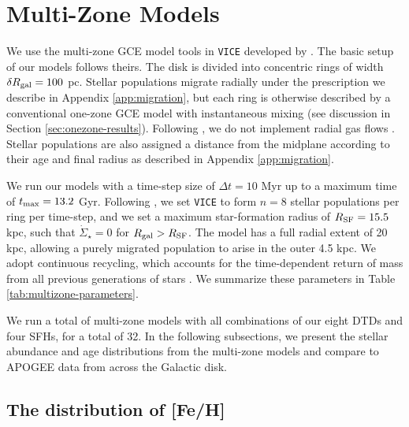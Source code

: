 \documentclass[twocolumn,twocolappendix,linenumbers]{aastex631}
\newcommand{\vice}{{\tt VICE}\xspace}
\begin{document}
\section{Multi-Zone Models}
\label{sec:multizone-results}

We use the multi-zone GCE model tools in \vice developed by . The basic setup of our models follows theirs. The disk is divided into concentric rings of width $\delta R_{\rm gal}=100$ pc. Stellar populations migrate radially under the prescription we describe in Appendix \ref{app:migration}, but each ring is otherwise described by a conventional one-zone GCE model with instantaneous mixing (see discussion in Section \ref{sec:onezone-results}). Following , we do not implement radial gas flows \citep[e.g.,][]{LaceyFall1985-RadialGasFlows,BilitewskiSchonrich2012-RadialFlows}. Stellar populations are also assigned a distance from the midplane according to their age and final radius as described in Appendix \ref{app:migration}.

We run our models with a time-step size of $\Delta t=10$ Myr up to a maximum time of $t_{\rm max}=13.2$ Gyr. Following , we set \vice to form $n=8$ stellar populations per ring per time-step, and we set a maximum star-formation radius of $R_{\rm SF} = 15.5$ kpc, such that $\dot\Sigma_\star=0$ for $R_{\rm gal}>R_{\rm SF}$. The model has a full radial extent of 20 kpc, allowing a purely migrated population to arise in the outer 4.5 kpc. We adopt continuous recycling, which accounts for the time-dependent return of mass from all previous generations of stars \citep[see Equation 2 from][]{JohnsonWeinberg2020-Starbursts}. We summarize these parameters in Table \ref{tab:multizone-parameters}.

We run a total of multi-zone models with all combinations of our eight DTDs and four SFHs, for a total of 32. In the following subsections, we present the stellar abundance and age distributions from the multi-zone models and compare to APOGEE data from across the Galactic disk.

\subsection{The distribution of [Fe/H]}
\label{sec:feh-df}
\end{document}
